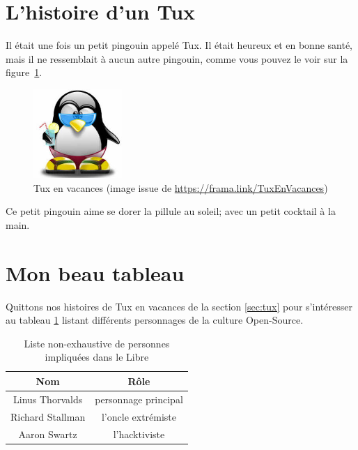 \documentclass[a4paper, 12pt]{article}
\begin{document}
\section{L'histoire d'un Tux \label{sec:tux}}
Il était une fois un petit pingouin appelé Tux.  Il était heureux et en bonne santé, mais il ne ressemblait à aucun autre pingouin, comme vous pouvez le voir sur la figure~\ref{fig:tux}.
\begin{figure}
\centering
\includegraphics[width=0.3\textwidth]{tux.jpeg}
\caption{Tux en vacances (image issue de \url{https://frama.link/TuxEnVacances})}
\label{fig:tux}
\end{figure}
Ce petit pingouin aime se dorer la pillule au soleil; avec un petit cocktail à la main.

\section{Mon beau tableau}
Quittons nos histoires de Tux en vacances de la section \ref{sec:tux} pour s'intéresser au tableau \ref{tab:Linux} listant différents personnages de la culture Open-Source.
\begin{table}
\centering
\begin{tabular}{|c||c|}
\hline
Nom & Rôle \\
\hline
\hline
Linus Thorvalds & personnage principal \\
\hline
Richard Stallman & l'oncle extrémiste \\
\hline
Aaron Swartz & l'hacktiviste \\
\hline
\end{tabular}
\caption{Liste non-exhaustive de personnes impliquées dans le Libre}
\label{tab:Linux}
\end{table}
\end{document}
